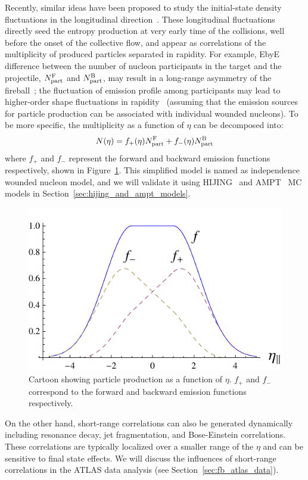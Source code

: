 Recently, similar ideas have been proposed to study the initial-state density fluctuations in the longitudinal direction~\cite{Bozek:2010vz, Bzdak:2012tp, Jia:2014ysa, Bhalerao:2014mua}. These longitudinal fluctuations directly seed the entropy production at very early time of the collisions, well before the onset of the collective flow, and appear as correlations of the multiplicity of produced particles separated in rapidity. For example, EbyE difference between the number of nucleon participants in the target and the projectile, $N_\text{part}^\text{F}$ and $N_\text{part}^\text{B}$, may result in a long-range asymmetry of the fireball~\cite{Bzdak:2012tp, Jia:2014ysa, Bialas:2011bz}; the fluctuation of emission profile among participants may lead to higher-order shape fluctuations in rapidity~\cite{Bzdak:2012tp, Jia:2014vja} (assuming that the emission sources for particle production can be associated with individual wounded nucleons). To be more specific, the multiplicity as a function of $\eta$ can be decomposed into:
\begin{equation}
N(\eta) = f_+(\eta) N_\text{part}^\text{F} + f_-(\eta) N_\text{part}^\text{B}
\end{equation}
where $f_+$ and $f_-$ represent the forward and backward emission functions respectively, shown in Figure~\ref{fig:fbcorr_cartoon_fb}. This simplified model is named as independence wounded nucleon model, and we will validate it using HIJING~\cite{Gyulassy:1994ew} and AMPT~\cite{Lin:2004en} MC models in Section~\ref{sec:hijing_and_ampt_models}.
\begin{figure}[H]
\centering
\includegraphics[width=.75\linewidth]{figs/chapter_fbcorr/cartoon_fb.pdf}
\caption{Cartoon showing particle production as a function of $\eta$. $f_+$ and $f_-$ correspond to the forward and backward emission functions respectively.}
\label{fig:fbcorr_cartoon_fb}
\end{figure}

On the other hand, short-range correlations can also be generated dynamically including resonance decay, jet fragmentation, and Bose-Einstein correlations. These correlations are typically localized over a smaller range of the $\eta$ and can be sensitive to final state effects. We will discuss the influences of short-range correlations in the ATLAS data analysis (see Section~\ref{sec:fb_atlas_data}).




